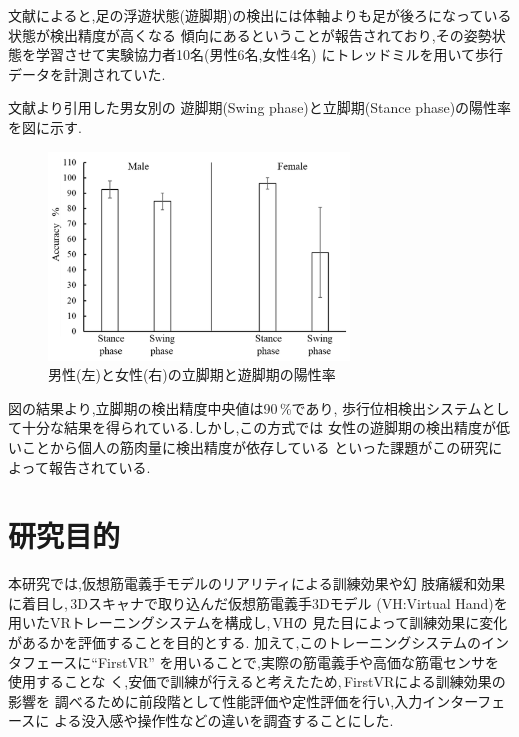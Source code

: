 \documentclass{ltjsreport}
\begin{document}
		文献\cite{ref:6}によると,足の浮遊状態(遊脚期)の検出には体軸よりも足が後ろになっている状態が検出精度が高くなる
		傾向にあるということが報告されており,その姿勢状態を学習させて実験協力者10名(男性6名,女性4名)
		にトレッドミルを用いて歩行データを計測されていた.

		文献\cite{ref:6}より引用した男女別の
		遊脚期(Swing phase)と立脚期(Stance phase)の陽性率を図に示す.

		\begin{figure}[H]
		\centering
		\includegraphics[width = 8cm]{../figs/sensors-21-01081-g010.jpg}
		\hspace{-32truemm}
		\caption{男性(左)と女性(右)の立脚期と遊脚期の陽性率\\}
		\label{fig:RR-malefemale}
		\end{figure}

		図の結果より,立脚期の検出精度中央値は90\,\%であり,
		歩行位相検出システムとして十分な結果を得られている.しかし,この方式では
		女性の遊脚期の検出精度が低いことから個人の筋肉量に検出精度が依存している
		といった課題がこの研究によって報告されている.

		\section{研究目的}
		本研究では,仮想筋電義手モデルのリアリティによる訓練効果や幻
		肢痛緩和効果に着目し,\,3Dスキャナで取り込んだ仮想筋電義手3Dモデル
		(VH:Virtual Hand)を用いたVRトレーニングシステムを構成し,\,VHの
		見た目によって訓練効果に変化があるかを評価することを目的とする.
		加えて,このトレーニングシステムのインタフェースに``FirstVR''\cite{ref:3}
		を用いることで,実際の筋電義手や高価な筋電センサを使用することな
		く,安価で訓練が行えると考えたため,\,FirstVRによる訓練効果の影響を
		調べるために前段階として性能評価や定性評価を行い,入力インターフェースに
		よる没入感や操作性などの違いを調査することにした.
\end{document}
